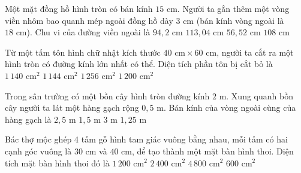 \begin{ex} %
Một mặt đồng hồ hình tròn có bán kính $15\text{ cm}$. Người ta gắn thêm một vòng viền nhôm bao quanh mép ngoài đồng hồ dày $3\text{ cm}$ (bán kính vòng ngoài là $18\text{ cm}$). Chu vi của đường viền ngoài là
\choice
{$94{,}2\text{ cm}$}
{\True $113{,}04\text{ cm}$}
{$56{,}52\text{ cm}$}
{$108\text{ cm}$}
\end{ex}

\begin{ex} %
Từ một tấm tôn hình chữ nhật kích thước $40\text{ cm} \times 60\text{ cm}$, người ta cắt ra một hình tròn có đường kính lớn nhất có thể. Diện tích phần tôn bị cắt bỏ là
\choice
{$1\,140\text{ cm}^2$}
{\True $1\,144\text{ cm}^2$}
{$1\,256\text{ cm}^2$}
{$1\,200\text{ cm}^2$}
\end{ex}

\begin{ex} %
Trong sân trường có một bồn cây hình tròn đường kính $2\text{ m}$. Xung quanh bồn cây người ta lát một hàng gạch rộng $0{,}5\text{ m}$. Bán kính của vòng ngoài cùng của hàng gạch là
\choice
{$2{,}5\text{ m}$}
{\True $1{,}5\text{ m}$}
{$3\text{ m}$}
{$1{,}25\text{ m}$}
\end{ex}

\begin{ex} %
Bác thợ mộc ghép 4 tấm gỗ hình tam giác vuông bằng nhau, mỗi tấm có hai cạnh góc vuông là $30\text{ cm}$ và $40\text{ cm}$, để tạo thành một mặt bàn hình thoi. Diện tích mặt bàn hình thoi đó là
\choice
{$1\,200\text{ cm}^2$}
{\True $2\,400\text{ cm}^2$}
{$4\,800\text{ cm}^2$}
{$600\text{ cm}^2$}
\end{ex}

